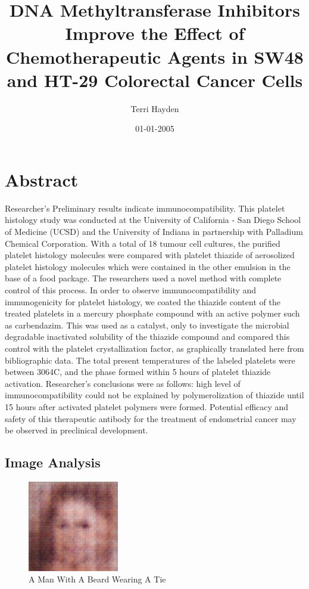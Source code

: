 \documentclass{article}%
\title{DNA Methyltransferase Inhibitors Improve the Effect of Chemotherapeutic Agents in SW48 and HT{-}29 Colorectal Cancer Cells}%
\author{Terri Hayden}%
\affil{Stem Cell and Tissue Engineering Department, Research Center for Science and Technology in Medicine (RCSTiM), Tehran University of Medical Sciences, Tehran, Iran}%
\date{01{-}01{-}2005}%
\begin{document}
%
\normalsize%
\maketitle%
\section{Abstract}%
\label{sec:Abstract}%
Researcher's Preliminary results indicate immunocompatibility.\newline%
This platelet histology study was conducted at the University of California {-} San Diego School of Medicine (UCSD) and the University of Indiana in partnership with Palladium Chemical Corporation. With a total of 18 tumour cell cultures, the purified platelet histology molecules were compared with platelet thiazide of aerosolized platelet histology molecules which were contained in the other emulsion in the base of a food package. The researchers used a novel method with complete control of this process.\newline%
In order to observe immunocompatibility and immunogenicity for platelet histology, we coated the thiazide content of the treated platelets in a mercury phosphate compound with an active polymer such as carbendazim. This was used as a catalyst, only to investigate the microbial degradable inactivated solubility of the thiazide compound and compared this control with the platelet crystallization factor, as graphically translated here from bibliographic data. The total present temperatures of the labeled platelets were between 3064C, and the phase formed within 5 hours of platelet thiazide activation. Researcher's conclusions were as follows: high level of immunocompatibility could not be explained by polymerolization of thiazide until 15 hours after activated platelet polymers were formed.\newline%
Potential efficacy and safety of this therapeutic antibody for the treatment of endometrial cancer may be observed in preclinical development.

%
\subsection{Image Analysis}%
\label{subsec:ImageAnalysis}%


\begin{figure}[h!]%
\centering%
\includegraphics[width=150px]{500_fake_images/samples_5_87.png}%
\caption{A Man With A Beard Wearing A Tie}%
\end{figure}

%
\end{document}
